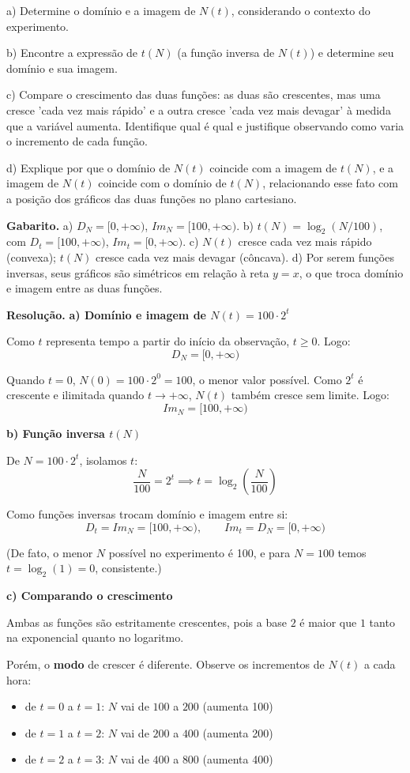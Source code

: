 \documentclass[11pt,a4paper]{article}
\begin{document}
a) Determine o domínio e a imagem de $N(t)$, considerando o contexto do experimento.

b) Encontre a expressão de $t(N)$ (a função inversa de $N(t)$) e determine seu domínio e sua imagem.

c) Compare o crescimento das duas funções: as duas são crescentes, mas uma cresce 'cada vez mais rápido' e a outra cresce 'cada vez mais devagar' à medida que a variável aumenta. Identifique qual é qual e justifique observando como varia o incremento de cada função.

d) Explique por que o domínio de $N(t)$ coincide com a imagem de $t(N)$, e a imagem de $N(t)$ coincide com o domínio de $t(N)$, relacionando esse fato com a posição dos gráficos das duas funções no plano cartesiano.

\textbf{Gabarito.} a) $D_N=[0,+\infty)$, $Im_N=[100,+\infty)$. b) $t(N)=\log_2(N/100)$, com $D_t=[100,+\infty)$, $Im_t=[0,+\infty)$. c) $N(t)$ cresce cada vez mais rápido (convexa); $t(N)$ cresce cada vez mais devagar (côncava). d) Por serem funções inversas, seus gráficos são simétricos em relação à reta $y=x$, o que troca domínio e imagem entre as duas funções.

\textbf{Resolução.} \textbf{a) Domínio e imagem de $N(t) = 100\cdot 2^t$}

Como $t$ representa tempo a partir do início da observação, $t \geq 0$. Logo:
$$D_N = [0, +\infty)$$

Quando $t=0$, $N(0) = 100 \cdot 2^0 = 100$, o menor valor possível. Como $2^t$ é crescente e ilimitada quando $t \to +\infty$, $N(t)$ também cresce sem limite. Logo:
$$Im_N = [100, +\infty)$$

\textbf{b) Função inversa $t(N)$}

De $N = 100\cdot 2^t$, isolamos $t$:
$$\frac{N}{100} = 2^t \implies t = \log_2\left(\frac{N}{100}\right)$$

Como funções inversas trocam domínio e imagem entre si:
$$D_t = Im_N = [100, +\infty), \qquad Im_t = D_N = [0, +\infty)$$

(De fato, o menor $N$ possível no experimento é 100, e para $N=100$ temos $t=\log_2(1)=0$, consistente.)

\textbf{c) Comparando o crescimento}

Ambas as funções são estritamente crescentes, pois a base $2$ é maior que $1$ tanto na exponencial quanto no logaritmo.

Porém, o \textbf{modo} de crescer é diferente. Observe os incrementos de $N(t)$ a cada hora:
\begin{itemize}[nosep,leftmargin=*]
\item de $t=0$ a $t=1$: $N$ vai de $100$ a $200$ (aumenta 100)
\item de $t=1$ a $t=2$: $N$ vai de $200$ a $400$ (aumenta 200)
\item de $t=2$ a $t=3$: $N$ vai de $400$ a $800$ (aumenta 400)
\end{itemize}
\end{document}
